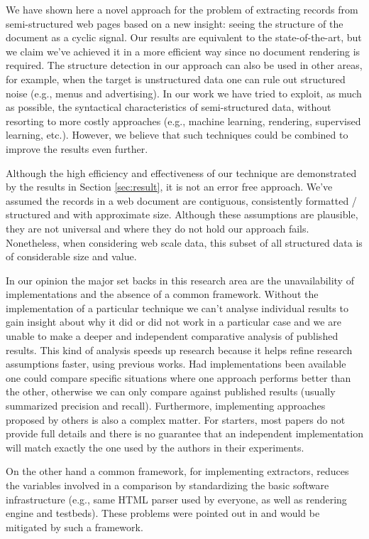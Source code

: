 We have shown here a novel approach for the problem of extracting records from
semi-structured web pages based on a new insight: seeing the structure of the
document as a cyclic signal. Our results are equivalent to the state-of-the-art,
but we claim we've achieved it in a more efficient way since no document
rendering is required. The structure detection in our approach can also be used
in other areas, for example, when the target is unstructured data one can rule
out structured noise (e.g., menus and advertising). In our work we have tried to
exploit, as much as possible, the syntactical characteristics of semi-structured
data, without resorting to more costly approaches (e.g., machine learning,
rendering, supervised learning, etc.). However, we believe that such techniques
could be combined to improve the results even further. 

Although the high efficiency and effectiveness of our technique are demonstrated
by the results in Section \ref{sec:result}, it is not an error free approach.
We've assumed the records in a web document are contiguous, consistently
formatted / structured and with approximate size. Although these assumptions are
plausible, they are not universal and where they do not hold our approach fails.
Nonetheless, when considering web scale data, this subset of all structured data
is of considerable size and value.

In our opinion the major set backs in this research area are the unavailability
of implementations and the absence of a common framework.
Without the implementation of a particular technique we can't analyse individual
results to gain insight about why it did or did not work in a particular case
and we are unable to make a deeper and independent comparative analysis of
published results. This kind of analysis speeds up research because it helps
refine research assumptions faster, using previous works. Had implementations
been available one could compare specific situations where one approach performs
better than the other, otherwise we can only compare against published results
(usually summarized precision and recall). Furthermore, implementing approaches
proposed by others is also a complex matter. For starters, most papers do not
provide full details and there is no guarantee that an independent
implementation will match exactly the one used by the authors in their
experiments.
 
On the other hand a common framework, for implementing extractors,
reduces the variables involved in a comparison by standardizing the basic
software infrastructure (e.g., same HTML parser used by everyone, as well as
rendering engine and testbeds). These problems were pointed out
in \cite{survey2013,survey2014} and would be mitigated by such a framework.
 

